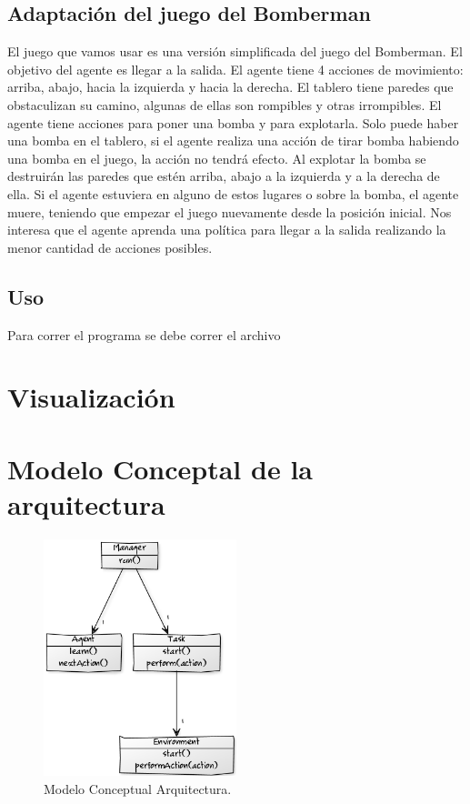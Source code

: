 \documentclass[a4paper,spanish] {article}
\begin{document}
	\subsection{Adaptaci\'on del juego del Bomberman}
	El juego que vamos usar es una versi\'on simplificada del juego del Bomberman. El objetivo del agente es llegar a la salida. El agente tiene 4 acciones de movimiento: arriba, abajo, hacia la izquierda y hacia la derecha. El tablero tiene paredes que obstaculizan su camino, algunas de ellas son rompibles y otras irrompibles. El agente tiene acciones para poner una bomba y para explotarla. Solo puede haber una bomba en el tablero, si el agente realiza una acci\'on de tirar bomba habiendo una bomba en el juego, la acci\'on no tendr\'a efecto. Al explotar la bomba se destruir\'an las paredes que est\'en arriba, abajo a la izquierda y a la derecha de ella. Si el agente estuviera en alguno de estos lugares o sobre la bomba, el agente muere, teniendo que empezar el juego nuevamente desde la posici\'on inicial. Nos interesa que el agente aprenda una pol\'itica para llegar a la salida realizando la menor cantidad de acciones posibles.	
	
	\subsection{Uso}
	Para correr el programa se debe correr el archivo

\section{Visualizaci\'on}
	
\section{Modelo Conceptal de la arquitectura}
	
	\begin{figure}[h!]
  \centering
    \includegraphics[width=0.5\textwidth]{MCarquitectra.png}
  \caption{Modelo Conceptual Arquitectura.}

	\end{figure}
\end{document}
